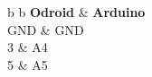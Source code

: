 \documentclass[12pt%
                    ]{report}
\begin{document}
\begin{table}[!h]
\begin{tabular}[c]{%
	b{\gnumericColA}%
	b{\gnumericColB}%
	}
\hhline{|-|-}
	 \multicolumn{1}{|p{\gnumericColA}|}%
	{\gnumericPB{\centering}\textbf{Odroid}}
	&\multicolumn{1}{p{\gnumericColB}|}%
	{\gnumericPB{\centering}\textbf{Arduino}}
	\\
\hhline{|--|}
	{\gnumericPB{\centering}GND}
	&%
	{\gnumericPB{\centering}GND}
\\
\hhline{|--|}
	{\gnumericPB{\centering}3}
	&%
	{\gnumericPB{\centering}A4}
\\
\hhline{|--|}
	{\gnumericPB{\centering}5}
	&%
	{\gnumericPB{\centering}A5}

\end{tabular}
\end{table}
\end{document}
